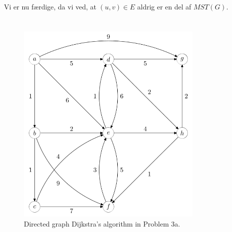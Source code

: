 \documentclass[a4paper,12pt]{article}
\begin{document}
Vi er nu færdige, da vi ved, at $(u,v)\in E$ aldrig er en del af $MST(G)$.

\subsection[]{}




\section[Question 3]{}
\begin{figure}[H]
    \centering
    \includegraphics[width=0.8\textwidth]{3.png}
    \caption{Directed graph Dijkstra's algorithm in Problem 3a.}
\end{figure}
\subsection[]{}
\end{document}
